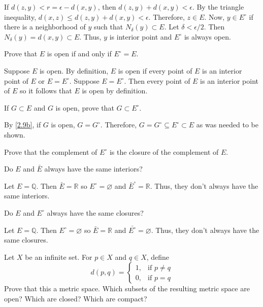 \begin{exercise}
\begin{exercise}[label = (\alph*), ref = \arabic{exercisei}(\alph*)]
    If \(d(z,y) < r = \epsilon - d(x,y)\), then \(d(z,y) + d(x,y) < \epsilon\).
    By the triangle inequality, \(d(x,z)\leq d(z,y) + d(x,y) < \epsilon\).
    Therefore, \(z\in E\).
    Now, \(y\in E^{\circ}\) if there is a neighborhood of \(y\) such that
    \(N_{\delta}(y)\subset E\).
    Let \(\delta < \epsilon/2\).
    Then \(N_{\delta}(y) = d(x,y)\subset E\).
    Thus, \(y\) is interior point and \(E^{\circ}\) is always open.
  \item
    \label{2.9b}
    Prove that \(E\) is open if and only if \(E^{\circ} = E\).
    \par\smallskip
    Suppose \(E\) is open.
    By definition, \(E\) is open if every point of \(E\) is an interior point
    of \(E\) or \(E = E^{\circ}\).
    Suppose \(E = E^{\circ}\).
    Then every point of \(E\) is an interior point of \(E\) so it follows that
    \(E\) is open by definition.
  \item
    If \(G\subset E\) and \(G\) is open, prove that \(G\subset E^{\circ}\).
    \par\smallskip
    By \cref{2.9b}, if \(G\) is open, \(G = G^{\circ}\).
    Therefore, \(G = G^{\circ}\subseteq E^{\circ}\subset E\) as was needed to
    be shown.
  \item
    Prove that the complement of \(E^{\circ}\) is the closure of the
    complement of \(E\).
  \item
    Do \(E\) and \(\bar{E}\) always have the same interiors?
    \par\smallskip
    Let \(E = \mathbb{Q}\).
    Then \(\bar{E} = \mathbb{R}\) so \(E^{\circ} = \varnothing\) and
    \(\bar{E}^{\circ} = \mathbb{R}\).
    Thus, they don't always have the same interiors.
  \item
    Do \(E\) and \(E^{\circ}\) always have the same closures?
    \par\smallskip
    Let \(E = \mathbb{Q}\).
    Then \(E^{\circ} = \varnothing\) so \(\bar{E} = \mathbb{R}\) and
    \(\bar{E^{\circ}} = \varnothing\).
    Thus, they don't always have the same closures.
  \end{exercise}
\item
  Let \(X\) be an infinite set.
  For \(p\in X\) and \(q\in X\), define
  \[
  d(p, q) =
  \begin{cases}
    1, & \text{if } p\neq q\\
    0, & \text{if } p = q
  \end{cases}
  \]
  Prove that this a metric space.
  Which subsets of the resulting metric space are open?
  Which are closed? Which are compact?

\end{exercise}
